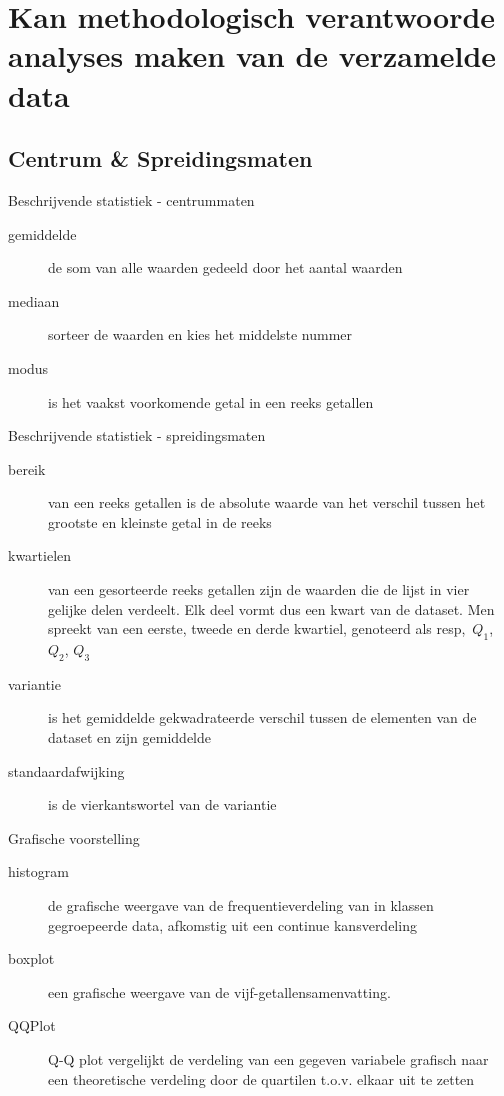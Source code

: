 \section{Kan methodologisch verantwoorde analyses maken van de verzamelde data }
\sectionframe{}

\subsection{Centrum \& Spreidingsmaten}
\begin{frame}{Beschrijvende statistiek - centrummaten}
	
	\begin{description}
		\item[gemiddelde] de som van alle waarden gedeeld door het aantal waarden
		\item[mediaan] sorteer de waarden en kies het middelste nummer
		\item[modus] is het vaakst voorkomende getal in een reeks getallen
	\end{description}
\end{frame}

\begin{frame}{Beschrijvende statistiek - spreidingsmaten}
	\begin{description}
		\item[bereik] van een reeks getallen is de absolute waarde van het verschil tussen het grootste en kleinste getal in de reeks
		\item[kwartielen] van een gesorteerde reeks getallen zijn de waarden die de lijst in vier gelijke delen verdeelt. Elk deel vormt dus een kwart van de dataset. Men spreekt van een eerste, tweede en derde kwartiel, genoteerd als resp,~$Q_1$, $Q_2$, $Q_3$
		\item[variantie] is het gemiddelde gekwadrateerde verschil tussen de elementen van de dataset en zijn gemiddelde
		\item[standaardafwijking] is de vierkantswortel van de variantie
	\end{description}
\end{frame}

\begin{frame}{Grafische voorstelling}
	\begin{description}
		\item[histogram] de grafische weergave van de frequentieverdeling van in klassen gegroepeerde data, afkomstig uit een continue kansverdeling 
		\item[boxplot] een grafische weergave van de vijf-getallensamenvatting.
		\item[QQPlot] Q-Q plot vergelijkt de verdeling van een gegeven variabele grafisch naar een theoretische verdeling door de quartilen t.o.v. elkaar uit te zetten 
	\end{description}
\end{frame}

